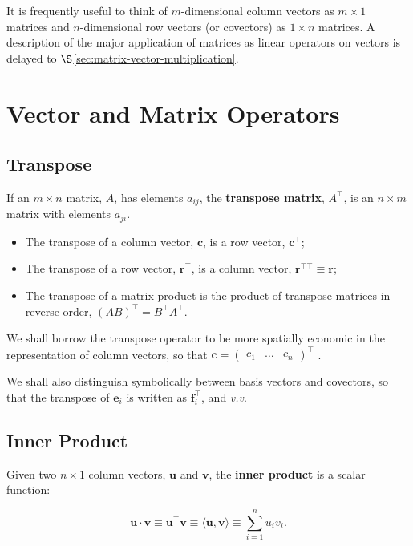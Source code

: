 \documentclass[12pt, twoside, draft]{article}
\begin{document}
It is frequently useful to think of $m$-dimensional column vectors as $m \times 1$ matrices and $n$-dimensional row vectors (or covectors) as $1 \times n$ matrices.  A description of the major application of matrices as linear operators on vectors is delayed to $\S$\ref{sec:matrix-vector-multiplication}.

\section{Vector and Matrix Operators}\label{sec:vector-matrix-operators}

\subsection{Transpose}\label{sec:transpose}
If an $m \times n$ matrix, $A$, has elements $a_{ij}$, the \textbf{transpose matrix}, $A^\top$, is an $n \times m$ matrix with elements $a_{ji}$.  
\begin{itemize}[noitemsep]
\item The transpose of a column vector, $\mathbf{c}$, is a row vector, $\mathbf{c}^\top$;
\item The transpose of a row vector, $\mathbf{r}^\top$, is a column vector, $\mathbf{r}^{\top \top} \equiv \mathbf{r}$;
\item The transpose of a matrix product is the product of transpose matrices in reverse order, $(AB)^\top = B^\top A^\top$.
\end{itemize}

We shall borrow the transpose operator to be more spatially economic in the representation of column vectors, so that $\mathbf{c} = \begin{pmatrix} c_1 & \ldots & c_n \end{pmatrix}^\top$ .

We shall also distinguish symbolically between basis vectors and covectors, so that the transpose of $\mathbf{e}_i$ is written as $\mathbf{f}_i^\top$, and \textit{v.v}.

\subsection{Inner Product}\label{sec:inner-product}
Given two $n \times 1$ column vectors, $\mathbf{u}$ and $\mathbf{v}$, the \textbf{inner product} is a scalar function:

\begin{equation}\label{eq:inner_product}
\mathbf{u} \cdot \mathbf{v} \equiv \mathbf{u}^\top \mathbf{v} \equiv \langle \mathbf{u}, \mathbf{v} \rangle \equiv \sum_{i=1}^{n} u_i v_i .
\end{equation}
\end{document}
